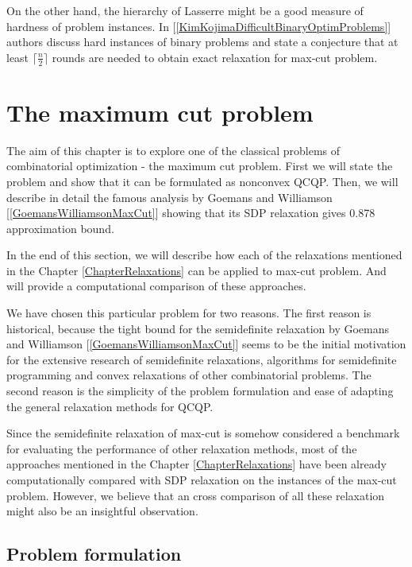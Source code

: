 \documentclass[12pt]{book}
\theoremstyle{definition}
\begin{document}
On the other hand, the hierarchy of Lasserre might be a good measure of hardness of problem instances. In [\ref{KimKojimaDifficultBinaryOptimProblems}]
authors discuss hard instances of binary problems and state a conjecture that at least $\lceil\frac{n}{2}\rceil$ rounds are needed to obtain exact relaxation for max-cut problem.



\chapter{The maximum cut problem}

 The aim of this chapter is to explore one of the classical problems of combinatorial optimization - the maximum cut problem. First we will state the problem and show that it can be formulated as nonconvex QCQP. Then, we will describe in detail the famous analysis by Goemans and Williamson [\ref{GoemansWilliamsonMaxCut}] showing that its SDP relaxation gives 0.878 approximation bound. 
 
In the end of this section, we will describe how each of the relaxations mentioned in the Chapter \ref{ChapterRelaxations} can be applied to max-cut problem. And will provide a computational comparison of these approaches.





We have chosen this particular problem for two reasons. The first reason is historical, because the tight bound for the semidefinite relaxation by Goemans and Williamson [\ref{GoemansWilliamsonMaxCut}] seems to be the initial motivation for the extensive research of semidefinite relaxations, algorithms for semidefinite programming and convex relaxations of other combinatorial problems. The second reason is the simplicity of the problem formulation and ease of adapting the general relaxation methods for QCQP.

Since the semidefinite relaxation of max-cut is somehow considered a benchmark for evaluating the performance of other relaxation methods, 
most of the approaches mentioned in the Chapter \ref{ChapterRelaxations} have been already computationally compared with SDP relaxation on the instances of the max-cut problem. However, we believe that an cross comparison of all these relaxation might also be an insightful observation.



\section{Problem formulation}
\end{document}
